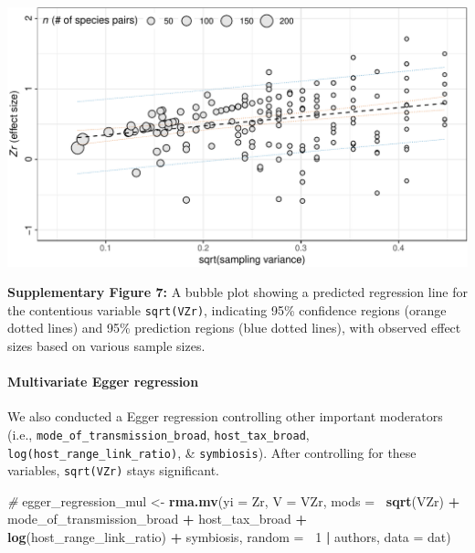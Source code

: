 \documentclass[
]{article}
\newenvironment{Shaded}{\begin{snugshade}}{\end{snugshade}}
\newcommand{\CommentTok}[1]{\textcolor[rgb]{0.56,0.35,0.01}{\textit{#1}}}
\newcommand{\DataTypeTok}[1]{\textcolor[rgb]{0.13,0.29,0.53}{#1}}
\newcommand{\DecValTok}[1]{\textcolor[rgb]{0.00,0.00,0.81}{#1}}
\newcommand{\KeywordTok}[1]{\textcolor[rgb]{0.13,0.29,0.53}{\textbf{#1}}}
\newcommand{\NormalTok}[1]{#1}
\newcommand{\OperatorTok}[1]{\textcolor[rgb]{0.81,0.36,0.00}{\textbf{#1}}}
\newcommand{\StringTok}[1]{\textcolor[rgb]{0.31,0.60,0.02}{#1}}
\begin{document}
\begin{Shaded}
\begin{Highlighting}[]
{{\NormalTok{fit_egger_regression_uni}
\end{Highlighting}
\end{Shaded}

\includegraphics{Supporting_Information_files/figure-latex/unnamed-chunk-55-1.pdf}

\textbf{Supplementary Figure 7:} A bubble plot showing a predicted
regression line for the contentious variable \texttt{sqrt(VZr)},
indicating 95\% confidence regions (orange dotted lines) and 95\%
prediction regions (blue dotted lines), with observed effect sizes based
on various sample sizes.

\hypertarget{multivariate-egger-regression}{%
\paragraph{Multivariate Egger
regression}\label{multivariate-egger-regression}}

We also conducted a Egger regression controlling other important
moderators (i.e., \texttt{mode\_of\_transmission\_broad},
\texttt{host\_tax\_broad}, \texttt{log(host\_range\_link\_ratio)}, \&
\texttt{symbiosis}). After controlling for these variables,
\texttt{sqrt(VZr)} stays significant.

\begin{Shaded}
\begin{Highlighting}[]
\CommentTok{# }
\NormalTok{egger_regression_mul <-}\StringTok{ }\KeywordTok{rma.mv}\NormalTok{(}\DataTypeTok{yi =}\NormalTok{ Zr, }\DataTypeTok{V =}\NormalTok{ VZr, }\DataTypeTok{mods =} \OperatorTok{~}\KeywordTok{sqrt}\NormalTok{(VZr) }\OperatorTok{+}\StringTok{ }\NormalTok{mode_of_transmission_broad }\OperatorTok{+}\StringTok{ }
\StringTok{    }\NormalTok{host_tax_broad }\OperatorTok{+}\StringTok{ }\KeywordTok{log}\NormalTok{(host_range_link_ratio) }\OperatorTok{+}\StringTok{ }\NormalTok{symbiosis, }\DataTypeTok{random =} \OperatorTok{~}\DecValTok{1} \OperatorTok{|}\StringTok{ }\NormalTok{authors, }
    \DataTypeTok{data =}\NormalTok{ dat)}
\end{Highlighting}
\end{Shaded}
\end{document}
